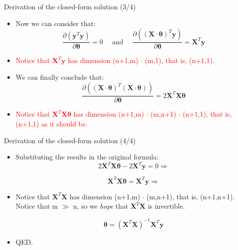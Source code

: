 \documentclass{beamer}
\begin{document}
\begin{frame}
{\centerline{Derivation of the closed-form solution  (3/4) }}

\begin{itemize}
\item Now we can consider that:
  $$ \frac{\partial (  \boldsymbol y^T \boldsymbol y )}
 { \partial \boldsymbol \theta} = 0 \text{~~~~and~~~~}   \frac{\partial (
  (\boldsymbol X \cdot \boldsymbol \theta)^T \boldsymbol y
 )}
 { \partial \boldsymbol \theta} = \boldsymbol X^T \boldsymbol y  $$
 \item \textcolor{red}{Notice that $\boldsymbol X^T \boldsymbol y$ has dimension (n+1,m) $\cdot$ (m,1), that is, (n+1,1).}

 \item We can finally conclude that:
  $$ \frac{\partial (
 (\boldsymbol X \cdot \boldsymbol \theta)^T (\boldsymbol X \cdot \boldsymbol \theta) )}
 { \partial \boldsymbol \theta} = 2  \boldsymbol X^T  \boldsymbol X \boldsymbol \theta $$
 \item \textcolor{red}{Notice that $\boldsymbol X^T \boldsymbol X \boldsymbol \theta$ has dimension (n+1,m) $\cdot$ (m,n+1)  $\cdot$ (n+1,1), that is, (n+1,1) as it should be.}

\end{itemize}

\end{frame}

\begin{frame}
{\centerline{Derivation of the closed-form solution (4/4) }}

\begin{itemize}
\item Substituting the results in the original formula:
  $$ 2  \boldsymbol X^T  \boldsymbol X \boldsymbol \theta - 2 \boldsymbol X^T \boldsymbol y = 0 \Rightarrow $$
  
    $$ \boldsymbol X^T  \boldsymbol X \boldsymbol \theta = \boldsymbol X^T \boldsymbol y  \Rightarrow $$
    
  \item Notice that $\boldsymbol X^T \boldsymbol X $ has dimension (n+1,m) $\cdot$ (m,n+1), that is, (n+1,n+1). Notice that m $\gg$ n, so we \textit{hope} that $\boldsymbol X^T \boldsymbol X $ is invertible.

    
        $$ \boldsymbol \theta = (\boldsymbol X^T  \boldsymbol X)^{-1}  \boldsymbol X^T \boldsymbol y  $$
        
\item QED.

\end{itemize}

\end{frame}
\end{document}
